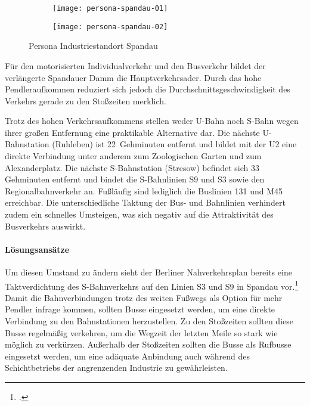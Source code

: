 \begin{figure}
    \centering
    \begin{subfigure}{.5\textwidth}
        \centering
        \texttt{[image: persona-spandau-01]}
    \end{subfigure}%
    \begin{subfigure}{.5\textwidth}
        \centering
        \texttt{[image: persona-spandau-02]}
    \end{subfigure}
    \caption{Persona Industriestandort Spandau}
    \label{persona-spandau}
\end{figure}

Für den motorisierten Individualverkehr und den Busverkehr bildet der verlängerte Spandauer Damm die Hauptverkehrsader. Durch das hohe Pendleraufkommen reduziert sich jedoch die Durchschnittsgeschwindigkeit des Verkehrs gerade zu den Stoßzeiten merklich.

Trotz des hohen Verkehrsaufkommens stellen weder U-Bahn noch S-Bahn wegen ihrer großen Entfernung eine praktikable Alternative dar. Die nächste U-Bahnstation (Ruhleben) ist 22~Gehminuten entfernt und bildet mit der U2 eine direkte Verbindung unter anderem zum Zoologischen Garten und zum Alexanderplatz. Die nächste S-Bahnstation (Stresow) befindet sich 33 Gehminuten entfernt und bindet die S-Bahnlinien S9 und S3 sowie den Regionalbahnverkehr an. Fußläufig sind lediglich die Buslinien 131 und M45 erreichbar. Die unterschiedliche Taktung der Bus- und Bahnlinien verhindert zudem ein schnelles Umsteigen, was sich negativ auf die Attraktivität des Busverkehrs auswirkt.

\paragraph{Lösungsansätze}

Um diesen Umstand zu ändern sieht der Berliner Nahverkehrsplan bereits eine Taktverdichtung des S-Bahnverkehrs auf den Linien S3 und S9 in Spandau vor.\footcite{NahverkehrsplanBerlin} Damit die Bahnverbindungen trotz des weiten Fußwegs als Option für mehr Pendler infrage kommen, sollten Busse eingesetzt werden, um eine direkte Verbindung zu den Bahnstationen herzustellen. Zu den Stoßzeiten sollten diese Busse regelmäßig verkehren, um die Wegzeit der letzten Meile so stark wie möglich zu verkürzen. Außerhalb der Stoßzeiten sollten die Busse als Rufbusse eingesetzt werden, um eine adäquate Anbindung auch während des Schichtbetriebs der angrenzenden Industrie zu gewährleisten.

